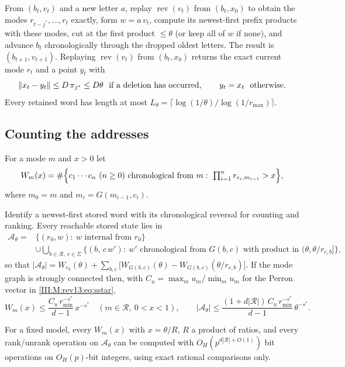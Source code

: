 \begin{lemma}\label{III:M:rev13:lem:mode-update}
From $(b_t,v_t)$ and a new letter $a$, replay $\operatorname{rev}(v_t)$ from $(b_t,x_0)$ to
obtain the modes $r_{t-j^\ast},\dots,r_t$ exactly, form $w=a\,v_t$, compute its
newest-first prefix products with these modes, cut at the first product $\le\theta$ (or
keep all of $w$ if none), and advance $b_t$ chronologically through the dropped oldest
letters. The result is $(b_{t+1},v_{t+1})$. Replaying $\operatorname{rev}(v_t)$ from
$(b_t,x_0)$ returns the exact current mode $r_t$ and a point $y_t$ with
\[
\left\lVert x_t-y_t\right\rVert\le D\,\pi_{j^\ast}\le D\theta\ \text{ if a deletion has occurred},\qquad
y_t=x_t\ \text{ otherwise}.
\]
Every retained word has length at most
$L_\theta=\lceil\log(1/\theta)/\log(1/r_{\max})\rceil$.
\end{lemma}


\subsection{Counting the addresses}
For a mode $m$ and $x>0$ let
\[
W_m(x)=\#\Bigl\{c_1\cdots c_n\ (n\ge0)\text{ chronological from }m:\ 
\textstyle\prod_{i=1}^n r_{c_i,m_{i-1}}>x\Bigr\},
\]
where $m_0=m$ and $m_i=G(m_{i-1},c_i)$.
\begin{lemma}\label{III:M:rev13:lem:mode-count}
Identify a newest-first stored word with its chronological reversal for
counting and ranking. Every reachable stored state lies in
\[
\begin{aligned}
\mathcal A_\theta={}&\{(r_0,w):\ w\text{ internal from }r_0\}\\
&\cup\bigcup_{b\in\mathcal R,\ c\in\Sigma}\{(b,\,c\,w'):\ w'\text{ chronological from }
G(b,c)\text{ with product in }(\theta,\theta/r_{c,b}]\},
\end{aligned}
\]
so that $|\mathcal A_\theta|=W_{r_0}(\theta)+\sum_{b,c}\bigl[W_{G(b,c)}(\theta)-
W_{G(b,c)}(\theta/r_{c,b})\bigr]$. If the mode graph is strongly connected then, with
$C_u=\max_mu_m/\min_mu_m$ for the Perron vector in \eqref{III:M:rev13:eq:sstar},
\[
W_m(x)\le\frac{C_u\,r_{\min}^{-s^\ast}}{d-1}\,x^{-s^\ast}\quad(m\in\mathcal R,\ 0<x<1),
\qquad
|\mathcal A_\theta|\le\frac{(1+d|\mathcal R|)\,C_u\,r_{\min}^{-s^\ast}}{d-1}\,\theta^{-s^\ast}.
\]
\end{lemma}


\begin{lemma}\label{III:M:rev13:lem:mode-dp}
For a fixed model, every $W_m(x)$ with $x=\theta/R$, $R$ a product of ratios, and every
rank/unrank operation on $\mathcal A_\theta$ can be computed with $O_H(p^{d|\mathcal R|+O(1)})$
bit operations on $O_H(p)$-bit integers, using exact rational comparisons only.
\end{lemma}


